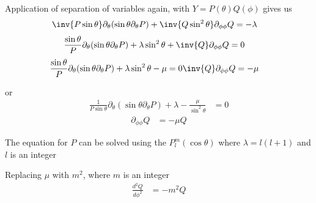 Application of separation of variables again, with \(Y = P(\theta) Q(\phi)\) gives us
%
\begin{equation}\label{eqn:lecture5BigReviewAngularMomentum:5120}
\begin{aligned}
\inv{P \sin\theta} \partial_\theta (\sin\theta \partial_\theta P) + \inv{Q \sin^2\theta} \partial_{\phi\phi} Q &= -\lambda
\end{aligned}
\end{equation}
%
\begin{equation}\label{eqn:lecture5BigReviewAngularMomentum:5140}
\begin{aligned}
\frac{\sin\theta}{P } \partial_\theta (\sin\theta \partial_\theta P)
+\lambda  \sin^2\theta
+ \inv{Q } \partial_{\phi\phi} Q &= 0
\end{aligned}
\end{equation}
%
\begin{equation}\label{eqn:lecture5BigReviewAngularMomentum:5160}
\begin{aligned}
\frac{\sin\theta}{P } \partial_\theta (\sin\theta \partial_\theta P) + \lambda \sin^2\theta - \mu = 0
\inv{Q } \partial_{\phi\phi} Q &= -\mu
\end{aligned}
\end{equation}

or
\begin{equation}\label{eqn:PHY356F:1000}
\begin{aligned}
\frac{1}{P \sin\theta} \partial_\theta (\sin\theta \partial_\theta P) +\lambda -\frac{\mu}{\sin^2\theta} &= 0
\end{aligned}
\end{equation}
\begin{equation}\label{eqn:PHY356F:2000}
\begin{aligned}
\partial_{\phi\phi} Q &= -\mu Q
\end{aligned}
\end{equation}

The equation for \(P\) can be solved using the  \(P_l^m(\cos\theta)\) where \(\lambda = l(l+1)\) and \(l\) is an integer

Replacing \(\mu\) with \(m^2\), where \(m\) is an integer
%
\begin{equation}\label{eqn:lecture5BigReviewAngularMomentum:5180}
\begin{aligned}
\frac{d^2 Q}{d\phi^2} &= -m^2 Q
\end{aligned}
\end{equation}

